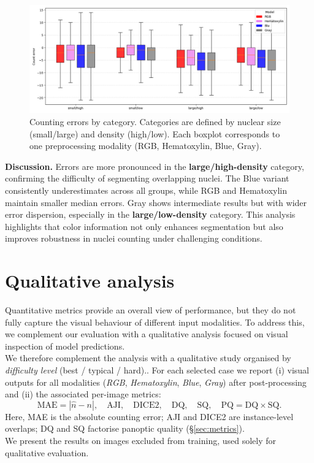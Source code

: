 \documentclass[target=bach,aauheader=,style=]{thud}
\begin{document}
\begin{figure}[h]
    \centering
    \includegraphics[width=\textwidth]{imgs/boxplot.png}
    \caption{Counting errors by category. Categories are defined by nuclear size (small/large) and density (high/low). Each boxplot corresponds to one preprocessing modality (RGB, Hematoxylin, Blue, Gray).}
    \label{fig:boxplot_categories}
\end{figure}

\noindent\textbf{Discussion.} 
Errors are more pronounced in the \textbf{large/high-density} category, confirming the difficulty of segmenting overlapping nuclei. 
The Blue variant consistently underestimates across all groups, while RGB and Hematoxylin maintain smaller median errors. 
Gray shows intermediate results but with wider error dispersion, especially in the \textbf{large/low-density} category. 
This analysis highlights that color information not only enhances segmentation but also improves robustness in nuclei counting under challenging conditions.
\section{Qualitative analysis}
\label{sec:qualitative}

Quantitative metrics provide an overall view of performance, but they do not fully capture the visual behaviour of different input modalities. To address this, we complement our evaluation with a qualitative analysis focused on visual inspection of model predictions.\\
We therefore complement the analysis with a qualitative study organised by \emph{difficulty level} (best / typical / hard).. 
For each selected case we report (i) visual outputs for all modalities (\emph{RGB}, \emph{Hematoxylin}, \emph{Blue}, \emph{Gray}) after post-processing and (ii) the associated per-image metrics:
\[
\text{MAE} = |\hat{n}-n|,\quad
\text{AJI},\quad
\text{DICE2},\quad
\text{DQ},\quad
\text{SQ},\quad
\text{PQ}=\text{DQ}\times\text{SQ}.
\]
Here, MAE is the absolute counting error; AJI and DICE2 are instance-level overlaps; DQ and SQ factorise panoptic quality (\S\ref{sec:metrics}).\\
We present the results on images excluded from training, used solely for qualitative evaluation.
\end{document}
